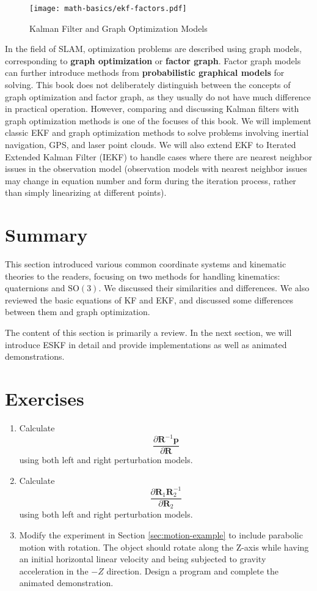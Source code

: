 \begin{figure}[!htp]
	\centering
	\texttt{[image: math-basics/ekf-factors.pdf]}
	\caption{Kalman Filter and Graph Optimization Models}
	\label{fig:ekf-factors}
\end{figure}

In the field of SLAM, optimization problems are described using graph models, corresponding to \textbf{graph optimization} or \textbf{factor graph}. Factor graph models can further introduce methods from \textbf{probabilistic graphical models} for solving. This book does not deliberately distinguish between the concepts of graph optimization and factor graph, as they usually do not have much difference in practical operation. However, comparing and discussing Kalman filters with graph optimization methods is one of the focuses of this book. We will implement classic EKF and graph optimization methods to solve problems involving inertial navigation, GPS, and laser point clouds. We will also extend EKF to Iterated Extended Kalman Filter (IEKF) to handle cases where there are nearest neighbor issues in the observation model (observation models with nearest neighbor issues may change in equation number and form during the iteration process, rather than simply linearizing at different points).

\section{Summary}
This section introduced various common coordinate systems and kinematic theories to the readers, focusing on two methods for handling kinematics: quaternions and $\mathrm{SO}(3)$. We discussed their similarities and differences. We also reviewed the basic equations of KF and EKF, and discussed some differences between them and graph optimization.

The content of this section is primarily a review. In the next section, we will introduce ESKF in detail and provide implementations as well as animated demonstrations.

\section*{Exercises}
\begin{enumerate}
	\item Calculate $$\frac{\partial \mathbf{R}^{-1} \mathbf{p}}{\partial \mathbf{R}}$$ using both left and right perturbation models.
	\item Calculate $$\frac{\partial \mathbf{R}_1 \mathbf{R}_2^{-1}}{\partial \mathbf{R}_2}$$ using both left and right perturbation models.
	\item Modify the experiment in Section \ref{sec:motion-example} to include parabolic motion with rotation. The object should rotate along the Z-axis while having an initial horizontal linear velocity and being subjected to gravity acceleration in the $-Z$ direction. Design a program and complete the animated demonstration.
\end{enumerate}

\newpage